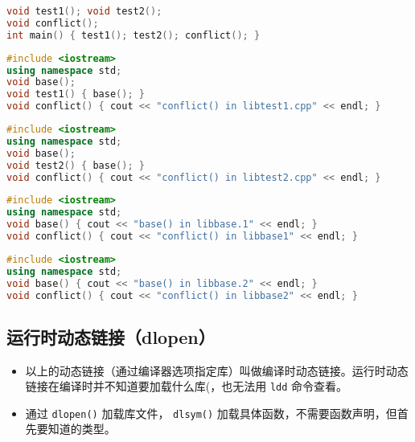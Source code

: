 \begin{lstlisting}[language=cpp, caption=main.cpp]
void test1(); void test2();
void conflict();
int main() { test1(); test2(); conflict(); }
\end{lstlisting}

\begin{lstlisting}[language=cpp, caption=libtest1.cpp]
#include <iostream>
using namespace std;
void base();
void test1() { base(); }
void conflict() { cout << "conflict() in libtest1.cpp" << endl; }
\end{lstlisting}

\begin{lstlisting}[language=cpp, caption=libtest2.cpp]
#include <iostream>
using namespace std;
void base();
void test2() { base(); }
void conflict() { cout << "conflict() in libtest2.cpp" << endl; }
\end{lstlisting}

\begin{lstlisting}[language=cpp, caption=libtest1.cpp]
#include <iostream>
using namespace std;
void base() { cout << "base() in libbase.1" << endl; }
void conflict() { cout << "conflict() in libbase1" << endl; }
\end{lstlisting}

\begin{lstlisting}[language=cpp, caption=libtest2.cpp]
#include <iostream>
using namespace std;
void base() { cout << "base() in libbase.2" << endl; }
void conflict() { cout << "conflict() in libbase2" << endl; }
\end{lstlisting}

\subsection{运行时动态链接（dlopen）}
\begin{itemize}
\item 以上的动态链接（通过编译器选项指定库）叫做编译时动态链接。运行时动态链接在编译时并不知道要加载什么库(，也无法用 \verb`ldd` 命令查看。
\item 通过 \verb`dlopen()` 加载库文件， \verb`dlsym()` 加载具体函数，不需要函数声明，但首先要知道的类型。
\end{itemize}

